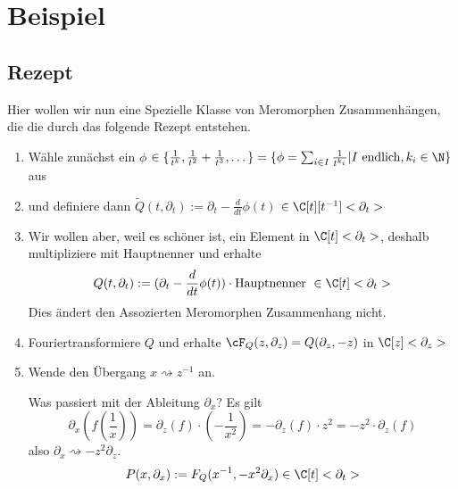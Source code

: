 \chapter{Beispiel}

\section{Rezept} \label{sec:allgemeinProblem}

\begin{comment}
siehe: \cite[5.b]{sabbah_Fourier-local}
\end{comment}

\begin{comment}
sei $\phi\in\{\frac{1}{t^k},\frac{1}{t^2}+\frac{1}{t^3},\dots\}$
\begin{enumerate}
\item Starte mit: $P(t,\partial_t):=(\partial_t-\frac{d}{dt}\phi(t)) \cdot
\mbox{Hauptnenner }\in\C[t]<\partial_t>$
\item Furiertrafo: $F_P(z,\partial_z)=P(\partial_z,-z)\in\C[z]<\partial_z>$
\item $x=z^{-1}$ und $\partial_x=-z^2\partial_z$ \\
\[
Q(x,\partial_x):=F_P(x^{-1},-x^2\partial_x)\cdot \mbox{Hauptnenner
}\in\C[x]<\partial_x>
\]

\textbf{Hauptnenner unnötig?!?}
\item Berechne für $Q$ das NP usw...
\end{enumerate}
\end{comment}

Hier wollen wir nun eine Spezielle Klasse von Meromorphen Zusammenhängen, die
die durch das folgende Rezept entstehen.
\begin{enumerate}
\item Wähle zunächst ein $\phi$
$\in\{\frac{1}{t^k},\frac{1}{t^2}+\frac{1}{t^3},\dots\}
=\{\phi=\sum_{i\in I}\frac{1}{t^{k_i}}|I \mbox{ endlich}, k_i\in\N\}$ aus
\item und definiere dann
$ \tilde Q(t,\partial_t):=\partial_t-\frac{d}{dt}\phi(t)$
$\in\C[t][t^{-1}]<\partial_t>$
\item Wir wollen aber, weil es schöner ist, ein Element in $\C[t]<\partial_t>$,
deshalb multipliziere mit Hauptnenner und erhalte
\[
Q(t,\partial_t):=(\partial_t-\frac{d}{dt}\phi(t)) \cdot
\mbox{Hauptnenner }\in\C[t]<\partial_t>
\]
Dies ändert den Assozierten Meromorphen Zusammenhang nicht.
\begin{comment}
Lemma?
\end{comment}
\item Fouriertransformiere $Q$ und erhalte
$\cF_Q(z,\partial_z)=Q(\partial_z,-z)$ in $\C[z]<\partial_z>$
\item Wende den Übergang $x\rightsquigarrow z^{-1}$ an.

Was passiert mit der Ableitung $\partial_x$? Es gilt
\[
\partial_x (f(\frac{1}{x}))=
\partial_z(f)\cdot (-\frac{1}{x^2})=
-\partial_z(f)\cdot z^2= %
- z^2 \cdot \partial_z(f)
\]
also $ \partial_x\rightsquigarrow-z^2\partial_z $.
\[
P(x,\partial_x):=F_Q(x^{-1},-x^2\partial_x) \in \C[t]<\partial_t>
\]
\end{enumerate}

